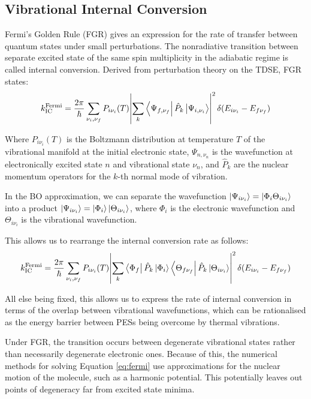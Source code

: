 \subsection{Vibrational Internal Conversion}
\label{sec:fgr}

Fermi's Golden Rule (FGR) gives an expression for the rate of transfer between quantum states under small perturbations.\cite{dirac1927} The nonradiative transition between separate excited state of the same spin multiplicity in the adiabatic regime is called internal conversion. Derived from perturbation theory on the TDSE, FGR states:
\begin{equation}
    k_{\text{IC}}^{\text{Fermi}} = \frac{2\pi}{\hbar} \sum_{\nu_i,\nu_f} P_{i\nu_i}(T) \abs{\sum_k \bra{\Psi_{f,\nu_f}}\hat{P}_k\ket{\Psi_{i,\nu_i}}}^2 \delta(E_{i\nu_i} - E_{f\nu_f})
    \label{eq:fermiprime}
\end{equation}

Where $P_{i\nu_i}(T)$ is the Boltzmann distribution at temperature $T$ of the vibrational manifold at the initial electronic state, $\Psi_{n,\nu_n}$ is the wavefunction at electronically excited state $n$ and vibrational state $\nu_n$, and $\hat{P}_k$ are the nuclear momentum operators for the $k$-th normal mode of vibration.

In the BO approximation, we can separate the wavefunction $\ket{\Psi_{i\nu_i}}=\ket{\Phi_i \Theta_{i\nu_i}}$ into a product $\ket{\Psi_{i\nu_i}}=\ket{\Phi_i} \ket{\Theta_{i\nu_i}}$, where $\Phi_i$ is the electronic wavefunction and $\Theta_{i\nu_i}$ is the vibrational wavefunction.

This allows us to rearrange the internal conversion rate as follows:\cite{Niu2010,Peng2016c}
\begin{equation}
    k_{\text{IC}}^{\text{Fermi}} = \frac{2\pi}{\hbar} \sum_{\nu_i,\nu_f} P_{i\nu_i}(T) \abs{\sum_k \bra{\Phi_f}\hat{P}_k\ket{\Phi_i} \bra{\Theta_{f\nu_f}}\hat{P}_k\ket{\Theta_{i\nu_i}}}^2 \delta(E_{i\nu_i} - E_{f\nu_f})
    \label{eq:fermi}
\end{equation}

All else being fixed, this allows us to express the rate of internal conversion in terms of the overlap between vibrational wavefunctions, which can be rationalised as the energy barrier between PESs being overcome by thermal vibrations.

Under FGR, the transition occurs between degenerate vibrational states rather than necessarily degenerate electronic ones. Because of this, the numerical methods for solving Equation \ref{eq:fermi} use approximations for the nuclear motion of the molecule, such as a harmonic potential. This potentially leaves out points of degeneracy far from excited state minima.

